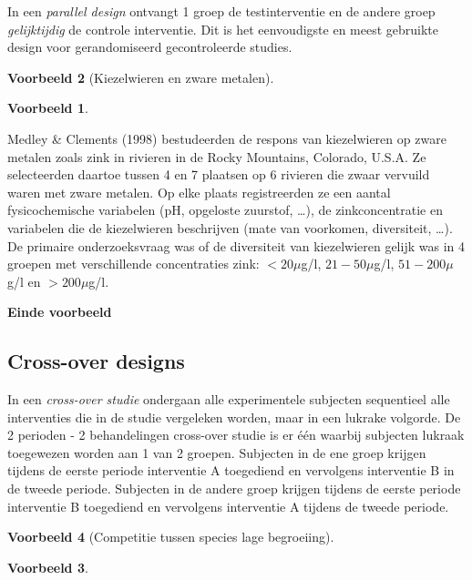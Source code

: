 \documentclass[
  12pt,dutch,coursenotes]{book}
\theoremstyle{definition}
\theoremstyle{definition}
\newtheorem{example}{Voorbeeld}[chapter]
\theoremstyle{definition}
\theoremstyle{remark}
\begin{document}
In een \emph{parallel design} ontvangt 1 groep de testinterventie en de
andere groep \emph{gelijktijdig} de controle interventie. Dit is het
eenvoudigste en meest gebruikte design voor gerandomiseerd gecontroleerde
studies.

\begin{example}[Kiezelwieren en zware metalen]
\begin{example}

\protect\hypertarget{exm:unnamed-chunk-75}{}{\label{exm:unnamed-chunk-75} \iffalse (Kiezelwieren en zware metalen) \fi{} }

\end{example}
\end{example}

Medley \& Clements (1998) bestudeerden de respons van kiezelwieren
op zware metalen zoals zink in rivieren in de Rocky Mountains, Colorado, U.S.A.
Ze selecteerden daartoe tussen 4 en 7 plaatsen op 6 rivieren die zwaar vervuild
waren met zware metalen. Op elke plaats registreerden ze een aantal fysicochemische
variabelen (pH, opgeloste zuurstof, \ldots), de zinkconcentratie en variabelen die de
kiezelwieren beschrijven (mate van voorkomen, diversiteit, \ldots).
De primaire onderzoeksvraag was of de diversiteit van kiezelwieren gelijk was in
4 groepen met verschillende concentraties zink:
\(<20 \mu\)g/l, \(21-50 \mu\)g/l, \(51-200 \mu\)g/l en \(>200 \mu\)g/l.

\textbf{Einde voorbeeld}

\hypertarget{cross-over-designs}{%
\subsection{Cross-over designs}\label{cross-over-designs}}

In een \emph{cross-over studie} ondergaan alle experimentele subjecten sequentieel alle
interventies die in de studie vergeleken worden, maar in een lukrake
volgorde. De 2 perioden - 2 behandelingen cross-over studie is er één
waarbij subjecten lukraak toegewezen worden aan 1 van 2 groepen.
Subjecten in de ene groep krijgen tijdens de eerste periode interventie A
toegediend en vervolgens interventie B in de tweede periode. Subjecten in
de andere groep krijgen tijdens de eerste periode interventie B toegediend
en vervolgens interventie A tijdens de tweede periode.

\begin{example}[Competitie tussen species lage begroeiing]
\begin{example}

\protect\hypertarget{exm:unnamed-chunk-76}{}{\label{exm:unnamed-chunk-76} \iffalse (Competitie tussen species lage begroeiing) \fi{} }

\end{example}
\end{example}
\end{document}
